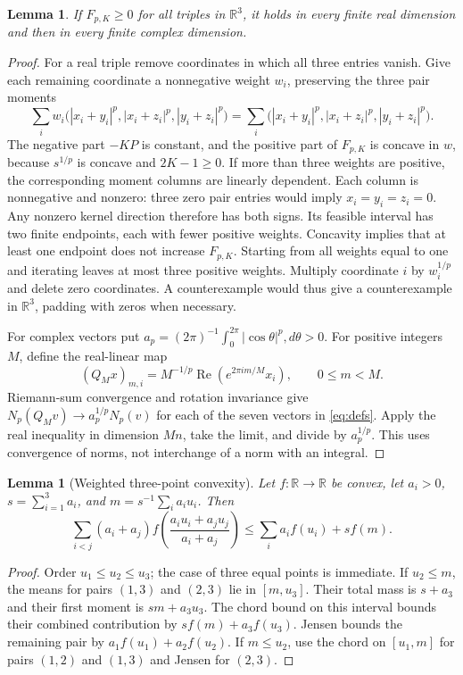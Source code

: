 \documentclass[11pt,a4paper]{article}
\newtheorem{lemma}[theorem]{Lemma}
\theoremstyle{remark}\newtheorem{remark}[theorem]{Remark}
\newcommand{\R}{\mathbb R}\newcommand{\C}{\mathbb C}
\newcommand{\Np}{N_p}\newcommand{\F}{F_{p,K}}
\DeclareMathOperator{\Rea}{Re}
\begin{document}
\begin{lemma}\label{lem:dim}
If $\F\ge0$ for all triples in $\R^3$, it holds in every finite real
dimension and then in every finite complex dimension.
\end{lemma}
\begin{proof}
For a real triple remove coordinates in which all three entries vanish.
Give each remaining coordinate a nonnegative weight $w_i$, preserving the
three pair moments
\[
\sum_i w_i\bigl(|x_i+y_i|^p,|x_i+z_i|^p,|y_i+z_i|^p\bigr)
=\sum_i\bigl(|x_i+y_i|^p,|x_i+z_i|^p,|y_i+z_i|^p\bigr).
\]
The negative part $-KP$ is constant, and the positive part of $\F$ is
concave in $w$, because $s^{1/p}$ is concave and $2K-1\ge0$.
If more than three weights are positive, the corresponding moment columns
are linearly dependent. Each column is nonnegative and nonzero: three zero
pair entries would imply $x_i=y_i=z_i=0$. Any nonzero kernel direction
therefore has both signs. Its feasible interval has two finite endpoints,
each with fewer positive weights. Concavity implies that at least one
endpoint does not increase $\F$. Starting from all weights equal to one
and iterating leaves at most three positive weights. Multiply coordinate
$i$ by $w_i^{1/p}$ and delete zero coordinates. A counterexample would thus
give a counterexample in $\R^3$, padding with zeros when necessary.

For complex vectors put $a_p=(2\pi)^{-1}\int_0^{2\pi}|\cos\theta|^p,d\theta>0$.
For positive integers $M$, define the real-linear map
\[
(Q_Mx)_{m,i}=M^{-1/p}\Rea(e^{2\pi im/M}x_i),\qquad 0\le m<M.
\]
Riemann-sum convergence and rotation invariance give
$\Np(Q_Mv)\longrightarrow a_p^{1/p}\Np(v)$ for each of the seven vectors
in \eqref{eq:defs}. Apply the real inequality in dimension $Mn$, take
the limit, and divide by $a_p^{1/p}$. This uses convergence of norms,
not interchange of a norm with an integral.
\end{proof}

\begin{lemma}[Weighted three-point convexity]\label{lem:weighted}
Let $f:\R\to\R$ be convex, let $a_i>0$, $s=\sum_{i=1}^3a_i$, and
$m=s^{-1}\sum_i a_i u_i$. Then
\[
\sum_{i<j}(a_i+a_j)f\left(\frac{a_iu_i+a_ju_j}{a_i+a_j}\right)
\le\sum_i a_if(u_i)+s f(m).
\]
\end{lemma}
\begin{proof}
Order $u_1\le u_2\le u_3$; the case of three equal points is immediate.
If $u_2\le m$, the means for pairs $(1,3)$ and $(2,3)$ lie in $[m,u_3]$.
Their total mass is $s+a_3$ and their first moment is $sm+a_3u_3$.
The chord bound on this interval bounds their combined contribution by
$sf(m)+a_3f(u_3)$. Jensen bounds the remaining pair by
$a_1f(u_1)+a_2f(u_2)$. If $m\le u_2$, use the chord on $[u_1,m]$
for pairs $(1,2)$ and $(1,3)$ and Jensen for $(2,3)$.
\end{proof}
\end{document}
